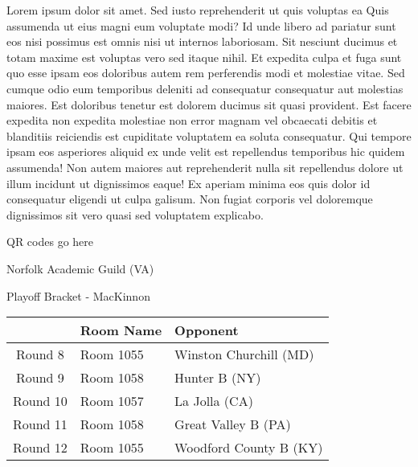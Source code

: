\documentclass{article}%
\begin{document}
\vspace*{8pt}%
\linebreak%
\newline%
\newline%
Lorem ipsum dolor sit amet. Sed iusto reprehenderit ut quis voluptas ea Quis assumenda ut eius magni eum voluptate modi? Id unde libero ad pariatur sunt eos nisi possimus est omnis nisi ut internos laboriosam. Sit nesciunt ducimus et totam maxime est voluptas vero sed itaque nihil. Et expedita culpa et fuga sunt quo esse ipsam eos doloribus autem rem perferendis modi et molestiae vitae.\newline%
\newline%
Sed cumque odio eum temporibus deleniti ad consequatur consequatur aut molestias maiores. Est doloribus tenetur est dolorem ducimus sit quasi provident. Est facere expedita non expedita molestiae non error magnam vel obcaecati debitis et blanditiis reiciendis est cupiditate voluptatem ea soluta consequatur. Qui tempore ipsam eos asperiores aliquid ex unde velit est repellendus temporibus hic quidem assumenda!\newline%
\newline%
Non autem maiores aut reprehenderit nulla sit repellendus dolore ut illum incidunt ut dignissimos eaque! Ex aperiam minima eos quis dolor id consequatur eligendi ut culpa galisum. Non fugiat corporis vel doloremque dignissimos sit vero quasi sed voluptatem explicabo.\newline%
\newline%
%
\vspace*{30pt}%
\begin{center}%
\begin{Huge}%
QR codes go here%
\end{Huge}%
\end{center}%
\newpage%
\begin{center}%
\begin{Huge}%
Norfolk Academic Guild (VA)%
\end{Huge}%
\vspace*{8pt}%
\linebreak%
\begin{Large}%
Playoff Bracket {-} MacKinnon%
\end{Large}%
\end{center}%
%
\begin{tabularx}{\textwidth}{|c|Y|Y|}%
\hline%
&Room Name&Opponent\\%
\hline%
Round 8&Room 1055&Winston Churchill (MD)\\%
Round 9&Room 1058&Hunter B (NY)\\%
Round 10&Room 1057&La Jolla (CA)\\%
Round 11&Room 1058&Great Valley B (PA)\\%
Round 12&Room 1055&Woodford County B (KY)\\%
\hline%
\end{tabularx}%
\end{document}
